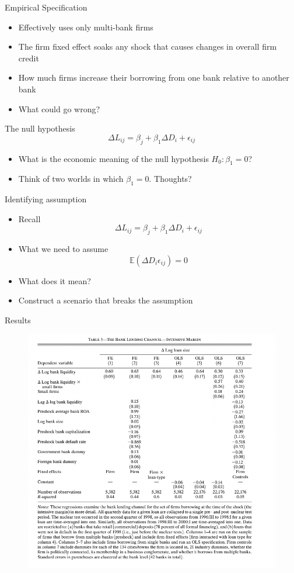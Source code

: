\documentclass[english,xcolor=svgnames]{beamer}
\begin{document}
\begin{frame}{Empirical Specification}
\begin{itemize}
\item Effectively uses only multi-bank firms
\item The firm fixed effect soaks any shock that causes changes in overall firm credit
\item How much firms increase their borrowing from one bank relative to another bank
\item What could go wrong?
\end{itemize}
\end{frame}

\begin{frame}{The null hypothesis}
$$\Delta L_{ij} = \beta_j + \beta_1 \Delta D_i + \epsilon_{ij}$$
\begin{itemize}
\item What is the economic meaning of the null hypothesis $H_0 : \beta_1 = 0$?
\item Think of two worlds in which $\beta_1 = 0$. Thoughts?
\end{itemize}
\end{frame}

\begin{frame}{Identifying assumption}
\begin{itemize}
\item Recall
$$\Delta L_{ij} = \beta_j + \beta_1 \Delta D_i + \epsilon_{ij}$$
\item What we need to assume
$$\mathbb{E}(\Delta D_i  \epsilon_{ij}) = 0$$
\item What does it mean?
\item Construct a scenario that breaks the assumption
\end{itemize}
\end{frame}

\begin{frame}{Results}
\begin{figure}
\includegraphics[scale=0.3]{figures/km_3}
\end{figure}\end{frame}
\end{document}
